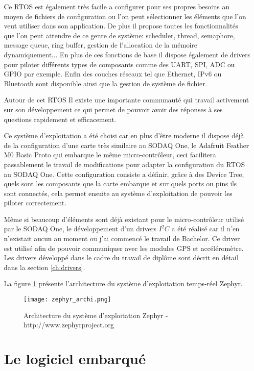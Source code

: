 Ce RTOS est également très facile a configurer pour ses propres besoins au moyen de fichiers de configuration ou l'on peut sélectionner les éléments que l'on veut utiliser dans son application. De plus il propose toutes les fonctionnalités que l'on peut attendre de ce genre de système: scheduler, thread, semaphore, message queue, ring buffer, gestion de l'allocation de la mémoire dynamiquement...
En plus de ces fonctions de base il dispose également de drivers pour piloter différents types de composants comme des UART, SPI, ADC ou GPIO par exemple. Enfin des couches réseaux tel que Ethernet, IPv6 ou Bluetooth sont disponible ainsi que la gestion de système de fichier. \cite{zephyr_web}

Autour de cet RTOS Il existe une importante communauté qui travail activement sur son développement ce qui permet de pouvoir avoir des réponses à ses questions rapidement et efficacement.

Ce système d'exploitation a été choisi car en plus d'être moderne il dispose déjà de la configuration d'une carte très similaire au SODAQ One, le Adafruit Feather M0 Basic Proto qui embarque le même micro-contrôleur, ceci facilitera passablement le travail de modifications pour adapter la configuration du RTOS au SODAQ One. Cette configuration consiste a définir, grâce à des Device Tree, quels sont les composants que la carte embarque et sur quels ports ou pins ils sont connectés, cela permet ensuite au système d'exploitation de pouvoir les piloter correctement.

Même si beaucoup d'éléments sont déjà existant pour le micro-contrôleur utilisé par le SODAQ One, le développement d'un drivers $I^{2}C$ a été réalisé car il n'en n'existait aucun au moment ou j'ai commencé le travail de Bachelor. Ce driver est utilisé afin de pouvoir communiquer avec les modules GPS et accéléromètre. Les drivers développé dans le cadre du travail de diplôme sont décrit en détail dans la section \ref{ch:drivers}.

La figure \ref{fig:zephyr_archi} présente l'architecture du système d'exploitation temps-réel Zephyr.

\begin{figure}[htb]
\centering 
\texttt{[image: zephyr\_archi.png]} 
\caption{Architecture du système d'exploitation Zephyr - http://www.zephyrproject.org}
\label{fig:zephyr_archi}
\end{figure}

\section{Le logiciel embarqué}

